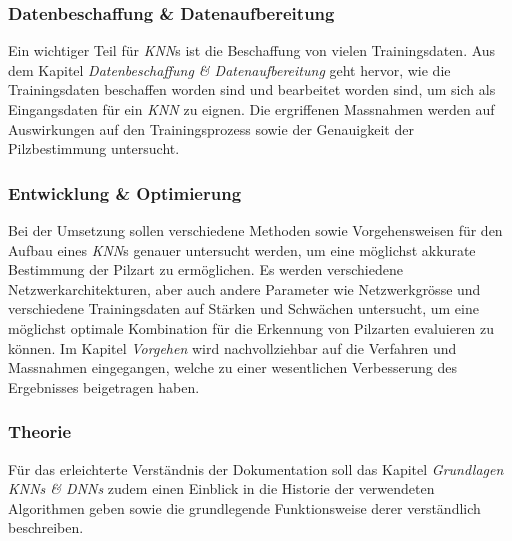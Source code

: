 \subsubsection{Datenbeschaffung \& Datenaufbereitung}
Ein wichtiger Teil für \textit{KNN}s ist die Beschaffung von vielen Trainingsdaten. Aus dem Kapitel \textit{Datenbeschaffung \& Datenaufbereitung} geht hervor, wie die Trainingsdaten beschaffen worden sind und bearbeitet worden sind, um sich als Eingangsdaten für ein \textit{KNN} zu eignen. Die ergriffenen Massnahmen werden auf Auswirkungen auf den Trainingsprozess sowie der Genauigkeit der Pilzbestimmung untersucht.

\subsubsection{Entwicklung \& Optimierung}
Bei der Umsetzung sollen verschiedene Methoden sowie Vorgehensweisen für den Aufbau eines \textit{KNN}s genauer untersucht werden, um eine möglichst akkurate Bestimmung der Pilzart zu ermöglichen. Es werden verschiedene Netzwerkarchitekturen, aber auch andere Parameter wie Netzwerkgrösse und verschiedene Trainingsdaten auf Stärken und Schwächen untersucht, um eine möglichst optimale Kombination für die Erkennung von Pilzarten evaluieren zu können. Im Kapitel \textit{Vorgehen} wird nachvollziehbar auf die Verfahren und Massnahmen eingegangen, welche zu einer wesentlichen Verbesserung des Ergebnisses beigetragen haben.

\subsubsection{Theorie}
Für das erleichterte Verständnis der Dokumentation soll das Kapitel \textit{Grundlagen KNNs \& DNNs} zudem einen Einblick in die Historie der verwendeten Algorithmen geben sowie die grundlegende Funktionsweise derer verständlich beschreiben. 


